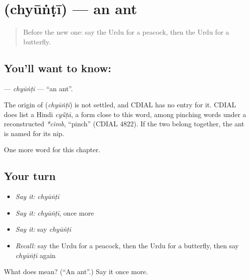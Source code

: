 \section[\texorpdfstring{\ur{چیونٹی} (chyūṅṭī)}{چیونٹی (chyūṅṭī)}]{ (chyūṅṭī) — an ant}

\label{lesson:UR-C126-chyunti}



\begin{quote}
Before the new one: say the Urdu for a peacock, then the Urdu for a butterfly.
\end{quote}

\subsection*{You'll want to know: }
\textbf{} — \emph{chyūṅṭī} — \textquotedblleft{}an ant\textquotedblright{}.

\begin{cousinweb}
The origin of \textbf{} (\emph{chyūṅṭī}) is not settled, and CDIAL has no entry for it. CDIAL does list a Hindi \emph{cyū̃ṭā}, a form close to this word, among pinching words under a reconstructed \emph{*cimb}, \textquotedblleft{}pinch\textquotedblright{} (CDIAL 4822). If the two belong together, the ant is named for its nip.
\end{cousinweb}

\begin{grammarlens}[title={What you've built}]
One more word for this chapter.
\end{grammarlens}

\subsection*{Your turn}
\begin{itemize}
\raggedright
  \item \emph{Say it:} \emph{chyūṅṭī}
  \item \emph{Say it:} \emph{chyūṅṭī}, once more
  \item \emph{Say it:} say \emph{chyūṅṭī}
  \item \emph{Recall:} say the Urdu for a peacock, then the Urdu for a butterfly, then say \emph{chyūṅṭī} again
\end{itemize}

\begin{tcolorbox}[breakable,colback=teal!4,colframe=teal!35!black,title={Before you move on}]
What does  mean? (\textquotedblleft{}An ant\textquotedblright{}.) Say it once more.
\end{tcolorbox}
